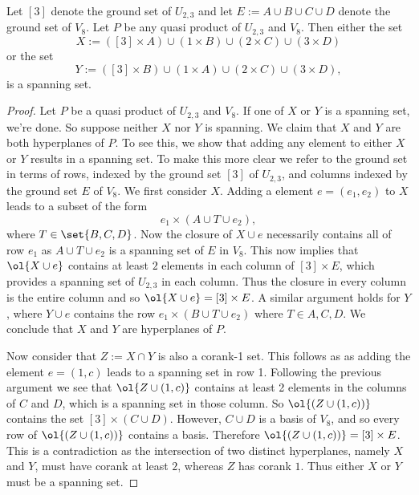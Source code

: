     \begin{proposition}\label{prop:XandY}
        Let $[3]$ denote the ground set of $U_{2,3}$ and let $E:=A\cup B\cup C\cup D$ denote the ground set of $V_8$. Let $P$ be any quasi product of $U_{2,3}$ and $V_8$. Then either the set
        $$X:=([3]\times A)\cup (1\times B)\cup (2\times C)\cup (3\times D)$$
        or the set
        $$Y:= ([3]\times B)\cup (1\times A)\cup (2\times C)\cup (3\times D),$$
        is a spanning set.
    \end{proposition}
    \begin{proof}
    
        Let $P$ be a quasi product of  $U_{2,3}$ and $V_8$. If one of $X$ or $Y$ is a spanning set, we're done. So suppose neither $X$ nor $Y$ is spanning. We claim that $X$ and $Y$ are both hyperplanes of $P$. To see this, we show that adding any element to either $X$ or $Y$ results in a spanning set. To make this more clear we refer to the ground set in terms of rows, indexed by the ground set $[3]$ of $U_{2,3}$, and columns indexed by the ground set $E$ of $V_8$. We first consider $X$. Adding a element $e=(e_1,e_2)$ to $X$ leads to a subset of the form
            $$e_1\times (A\cup T\cup e_2),$$
    where $T\in \set{B, C, D}$. Now the closure of $X\cup e$ necessarily contains all of row $e_1$ as $A\cup T\cup e_2$ is a spanning set of $E$ in $V_8$. This now implies that $\ol{X\cup e}$ contains at least $2$ elements in each column of $[3]\times E$, which provides a spanning set of $U_{2,3}$ in each column. Thus the closure in every column is the entire column and so $\ol{X\cup e}=[3]\times E$. A similar argument holds for $Y$, where $Y\cup e$ contains the row $e_1\times (B\cup T\cup e_2)$ where $T\in{A,C,D}$. We conclude that $X$ and $Y$ are hyperplanes of $P$. 

    
    Now consider that $Z:= X\cap Y$ is also a corank-1 set. This follows as as adding the element $e = (1,c)$ leads to a spanning set in row 1. Following the previous argument we see that $\ol{Z\cup (1,c)}$ contains at least 2 elements in the columns of $C$ and $D$, which is a spanning set in those column. So $\ol{(Z\cup(1,c))}$ contains the set $[3]\times (C\cup D)$. However, $C\cup D$ is a basis of $V_8$, and so every row of $\ol{(Z\cup(1,c))}$ contains a basis. Therefore $\ol{(Z\cup(1,c))}= [3]\times E$. This is a contradiction as the intersection of two distinct hyperplanes, namely $X$ and $Y$, must have corank at least $2$, whereas $Z$ has corank $1$. Thus either $X$ or $Y$ must be a spanning set.
    \end{proof}
    

